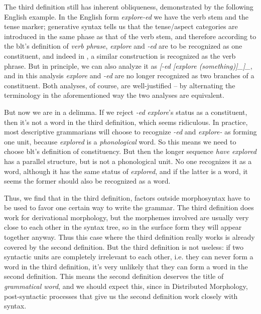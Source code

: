 \documentclass[UTF8, a4paper, oneside, scheme=plain, 12pt]{ctexrep}
\newcommand*{\term}[1]{\emph{#1}}
\newcommand{\form}[1]{\emph{#1}}
\newcommand{\vP}{\textit{v}P}
\begin{document}
{The third definition still has
inherent obliqueness, demonstrated by the following English example. 
In the English form \form{explore-ed} 
we have the verb stem and the tense marker;  
generative syntax tells us that the tense/aspect categories are 
introduced in the same phase as that of the verb stem, 
and therefore according to the \ac{blt}'s definition of 
\term{verb phrase}, 
\form{explore} and \form{-ed} are to be recognized as 
one constituent, 
and indeed in \citet{prins2011web}, 
a similar construction is recognized as the verb phrase.
But in principle, we can also analyze it as 
\form{[-ed [explore \emph{(something)}]_{\text{\vP{} (argument structure)}}]_{\text{TP (\acs{tame} marking)}}},
and in this analysis 
\form{explore} and \form{-ed} are no longer recognized as 
two branches of a constituent. 
Both analyses, of course, are well-justified -- 
by alternating the terminology in the aforementioned way 
the two analyses are equivalent.

But now we are in a delimma. 
If we reject \form{-ed explore}'s status as a constituent,
then it's not a word in the third definition,
which seems ridiculous.
In practice, most descriptive grammarians will choose to recognize 
\form{-ed} and \form{explore-} as forming one unit, 
because \form{explored} is a \emph{phonological} word.
So this means we need to choose \acs{blt}'s definition of constituency.
But then the longer sequence \form{have explored} 
has a parallel structure, 
but is not a phonological unit. 
No one recognizes it as a word, 
although it has the same status of \form{explored},
and if the latter is a word, 
it seems the former should also be recognized as a word.

Thus, we find that in the third definition, 
factors outside morphosyntax 
have to be used to favor one certain way to write the grammar. 
The third definition does work for derivational morphology,
but the morphemes involved are usually very close to each other 
in the syntax tree, 
so in the surface form they will appear together anyway.
Thus this case where the third definition really works
is already covered by the second definition.
But the third definition is not useless: 
if two syntactic units are completely irrelevant to each other, 
i.e. they can never form a word in the third definition, 
it's very unlikely that they can form a word in the second definition.
This means the second definition deserves the title of \term{grammatical word},
and we should expect this, 
since in Distributed Morphology, 
post-syntactic processes that give us the second definition 
work closely with syntax.

}
\end{document}
